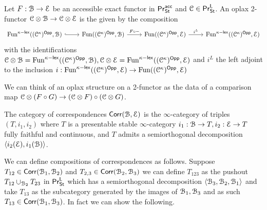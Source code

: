 \begin{definition}\label{def: oplax 2-functor}
    Let $F:\EuScript{B}\to\EuScript{E}$ be an accessible exact functor in $\mathsf{Pr}^{\mathsf{acc}}_{\mathsf{St}}$ and $\EuScript{C}\in\mathsf{Pr}^{\mathsf{L}}_{\mathsf{St}}$. An oplax 2-functor $\EuScript{C}\otimes\EuScript{B}\to\EuScript{C}\otimes\EuScript{E}$ is the given by the composition 
    $$%
    \begin{tikzcd}
        {\Fun^{\kappa-\lex}((\Cscr^{\kappa})^{\Opp},\Bscr)} & {\Fun((\Cscr^{\kappa})^{\Opp},\Bscr)} & {\Fun((\Cscr^{\kappa})^{\Opp},\Escr)} & {\Fun^{\kappa-\lex}((\Cscr^{\kappa})^{\Opp},\Escr)}
        \arrow[hook, from=1-1, to=1-2]
        \arrow["{F\circ-}", from=1-2, to=1-3]
        \arrow["{i^{L}}", from=1-3, to=1-4]
    \end{tikzcd}$$
    with the identifications $\EuScript{C}\otimes\EuScript{B}=\mathrm{Fun}^{\kappa-\mathsf{lex}}((\EuScript{C}^{\kappa})^{\mathsf{Opp}},\EuScript{B}), \EuScript{C}\otimes\EuScript{E}=\mathrm{Fun}^{\kappa-\mathsf{lex}}((\EuScript{C}^{\kappa})^{\mathsf{Opp}},
    \EuScript{E})$ and $i^{L}$ the left adjoint to the inclusion $i:\mathrm{Fun}^{\kappa-\mathsf{lex}}((\EuScript{C}^{\kappa})^{\mathsf{Opp}},\EuScript{E})\to\mathrm{Fun}((\EuScript{C}^{\kappa})^{\mathsf{Opp}},\EuScript{E})$
\end{definition}
\begin{remark}
    We can think of an oplax structure on a 2-functor as the data of a comparison map $\EuScript{C}\otimes(F\circ G)\to(\EuScript{C}\otimes F)\circ(\EuScript{C}\otimes G)$. 
\end{remark}
\begin{definition}\label{def: category of correspondences}
    The category of correspondences $\mathsf{Corr}(\EuScript{B},\EuScript{E})$ is the $\infty$-category of triples $(T,i_{1},i_{2})$ where $T$ is a presentable stable $\infty$-category $i_{1}:\EuScript{B}\to T, i_{2}:\EuScript{E}\to T$ fully faithful and continuous, and $T$ admits a semiorthogonal decomposition $\langle i_{2}(\EuScript{E}), i_{1}(\EuScript{B})\rangle$. 
\end{definition}
We can define compositions of correspondences as follows. Suppose $T_{12}\in\mathsf{Corr}(\EuScript{B}_{1},\EuScript{B}_{2})$ and $T_{2,3}\in\mathsf{Corr}(\EuScript{B}_{2},\EuScript{B}_{3})$ we can define $T_{123}$ as the pushout $T_{12}\cup_{\EuScript{B}_{2}}T_{23}$ in $\mathsf{Pr}^{\mathsf{L}}_{\mathsf{St}}$ which has a semiorthogonal decomposition $\langle\EuScript{B}_{3},\EuScript{B}_{2},\EuScript{B}_{1}\rangle$ and take $T_{13}$ as the subcategory generated by the images of $\EuScript{B}_{1},\EuScript{B}_{3}$ and as such $T_{13}\in\mathsf{Corr}(\EuScript{B}_{1},\EuScript{B}_{3})$. In fact we can show the following.
